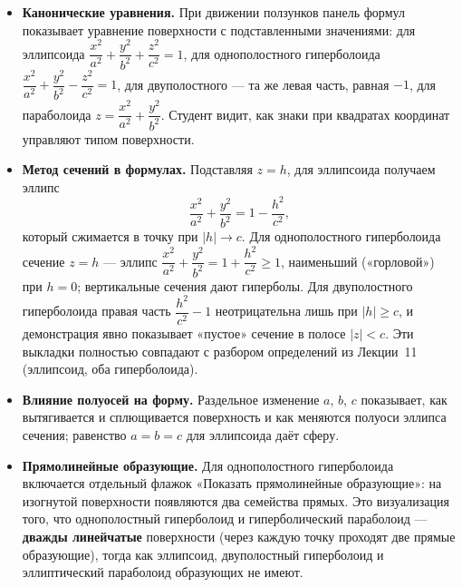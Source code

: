 \begin{itemize}
  \item \textbf{Канонические уравнения.} При движении ползунков панель
    формул показывает уравнение поверхности с подставленными
    значениями: для эллипсоида
    $\dfrac{x^2}{a^2} + \dfrac{y^2}{b^2} + \dfrac{z^2}{c^2} = 1$, для
    однополостного гиперболоида
    $\dfrac{x^2}{a^2} + \dfrac{y^2}{b^2} - \dfrac{z^2}{c^2} = 1$, для
    двуполостного --- та же левая часть, равная $-1$, для параболоида
    $z = \dfrac{x^2}{a^2} + \dfrac{y^2}{b^2}$. Студент видит, как знаки
    при квадратах координат управляют типом поверхности.

  \item \textbf{Метод сечений в формулах.} Подставляя $z = h$, для
    эллипсоида получаем эллипс
    \[
      \frac{x^2}{a^2} + \frac{y^2}{b^2} = 1 - \frac{h^2}{c^2},
    \]
    который сжимается в точку при $|h| \to c$. Для однополостного
    гиперболоида сечение $z = h$ --- эллипс
    $\dfrac{x^2}{a^2} + \dfrac{y^2}{b^2} = 1 + \dfrac{h^2}{c^2} \ge 1$,
    наименьший («горловой») при $h = 0$; вертикальные сечения дают
    гиперболы. Для двуполостного гиперболоида правая часть
    $\dfrac{h^2}{c^2} - 1$ неотрицательна лишь при $|h| \ge c$, и
    демонстрация явно показывает «пустое» сечение в полосе $|z| < c$.
    Эти выкладки полностью совпадают с разбором определений из
    Лекции~11 (эллипсоид, оба гиперболоида).

  \item \textbf{Влияние полуосей на форму.} Раздельное изменение $a$,
    $b$, $c$ показывает, как вытягивается и сплющивается поверхность и
    как меняются полуоси эллипса сечения; равенство $a = b = c$ для
    эллипсоида даёт сферу.

  \item \textbf{Прямолинейные образующие.} Для однополостного
    гиперболоида включается отдельный флажок «Показать прямолинейные
    образующие»: на изогнутой поверхности появляются два семейства
    прямых. Это визуализация того, что однополостный гиперболоид и
    гиперболический параболоид --- \textbf{дважды линейчатые}
    поверхности (через каждую точку проходят две прямые образующие),
    тогда как эллипсоид, двуполостный гиперболоид и эллиптический
    параболоид образующих не имеют.
\end{itemize}

